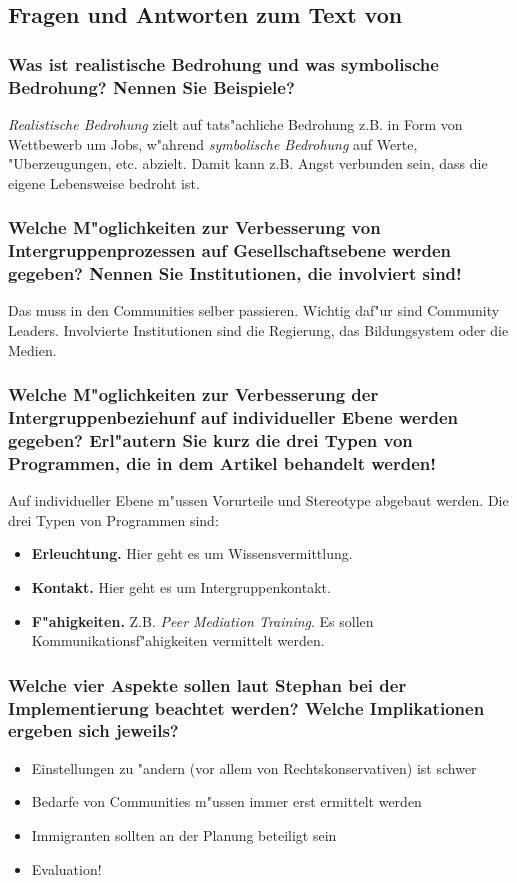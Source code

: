 \subsection{Fragen und Antworten zum Text von \textcite{stephan_improving_2012}}
\subsubsection{Was ist realistische Bedrohung und was symbolische Bedrohung? Nennen Sie Beispiele?}
\emph{Realistische Bedrohung} zielt auf tats"achliche Bedrohung z.B. in Form von Wettbewerb um Jobs, w"ahrend \emph{symbolische Bedrohung} auf Werte, "Uberzeugungen, etc. abzielt. Damit kann z.B. Angst verbunden sein, dass die eigene Lebensweise bedroht ist.

\subsubsection{Welche M"oglichkeiten zur Verbesserung von Intergruppenprozessen auf Gesellschaftsebene werden gegeben? Nennen Sie Institutionen, die involviert sind!}
Das muss in den Communities selber passieren. Wichtig daf"ur sind Community Leaders. Involvierte Institutionen sind die Regierung, das Bildungsystem oder die Medien.

\subsubsection{Welche M"oglichkeiten zur Verbesserung der Intergruppenbeziehunf auf individueller Ebene werden gegeben? Erl"autern Sie kurz die drei Typen von Programmen, die in dem Artikel behandelt werden!}
Auf individueller Ebene m"ussen Vorurteile und Stereotype abgebaut werden. Die drei Typen von Programmen sind:
\begin{itemize}
        \item \textbf{Erleuchtung.} Hier geht es um Wissensvermittlung.
        \item \textbf{Kontakt.} Hier geht es um Intergruppenkontakt.
        \item \textbf{F"ahigkeiten.} Z.B. \emph{Peer Mediation Training}. Es sollen Kommunikationsf"ahigkeiten vermittelt werden.
\end{itemize}

\subsubsection{Welche vier Aspekte sollen laut Stephan bei der Implementierung beachtet werden? Welche Implikationen ergeben sich jeweils?}
\begin{itemize}
        \item Einstellungen zu "andern (vor allem von Rechtskonservativen) ist schwer
        \item Bedarfe von Communities m"ussen immer erst ermittelt werden
        \item Immigranten sollten an der Planung beteiligt sein
        \item Evaluation!
\end{itemize}



